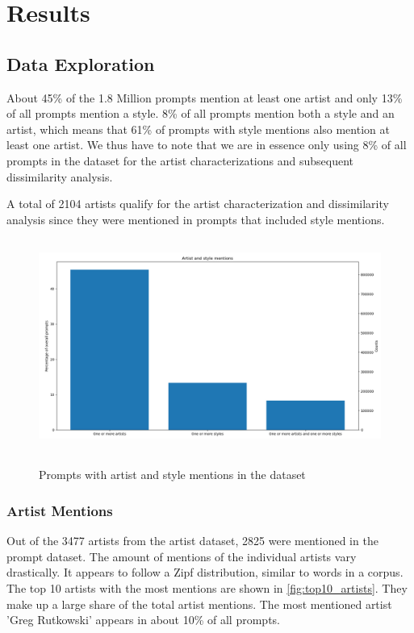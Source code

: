 \chapter{Results}
\label{cha:Results}


\section{Data Exploration}

About 45\% of the 1.8 Million prompts mention at least one artist and only 13\% of all prompts mention a style. 8\% of all prompts mention both a style and an artist, which means that 61\% of prompts with style mentions also mention at least one artist. We thus have to note that we are in essence only using 8\% of all prompts in the dataset for the artist characterizations and subsequent dissimilarity analysis.

A total of 2104 artists qualify for the artist characterization and dissimilarity analysis since they were mentioned in prompts that included style mentions.

\begin{figure}[h]
    \begin{center}
        \includegraphics[height=7cm]{Bilder/artist_and_style_mentions.png}\\[2.5ex]
    \end{center}
\caption{Prompts with artist and style mentions in the dataset}
\end{figure}

\subsection{Artist Mentions}

Out of the 3477 artists from the artist dataset, 2825 were mentioned in the prompt dataset. The amount of mentions of the individual artists vary drastically. It appears to follow a Zipf distribution, similar to words in a corpus. The top 10 artists with the most mentions are shown in \ref{fig:top10_artists}. They make up a large share of the total artist mentions. The most mentioned artist 'Greg Rutkowski' appears in about 10\% of all prompts.

